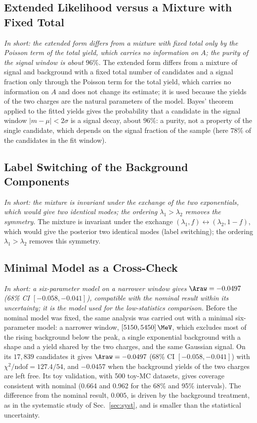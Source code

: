 \subsection{Extended Likelihood versus a Mixture with Fixed Total}
\emph{In short: the extended form differs from a mixture with fixed total only by the Poisson term of the total yield, which carries no information on $A$; the purity of the signal window is about $96\%$.}
The extended form differs from a mixture of signal and background with a fixed total number of candidates and a signal fraction only through the Poisson term for the total yield, which carries no information on $A$ and does not change its estimate; it is used because the yields of the two charges are the natural parameters of the model. Bayes' theorem applied to the fitted yields gives the probability that a candidate in the signal window $|m-\mu|<2\sigma$ is a signal decay, about $96\%$: a purity, not a property of the single candidate, which depends on the signal fraction of the sample (here $78\%$ of the candidates in the fit window).

\subsection{Label Switching of the Background Components}
\emph{In short: the mixture is invariant under the exchange of the two exponentials, which would give two identical modes; the ordering $\lambda_1>\lambda_2$ removes the symmetry.}
The mixture is invariant under the exchange $(\lambda_1,f)\leftrightarrow(\lambda_2,1-f)$, which would give the posterior two identical modes (label switching); the ordering $\lambda_1>\lambda_2$ removes this symmetry.

\subsection{Minimal Model as a Cross-Check}
\label{sec:bayes_minimal}
\emph{In short: a six-parameter model on a narrower window gives $\Araw=-0.0497$ (68\% CI $[-0.058,-0.041]$), compatible with the nominal result within its uncertainty; it is the model used for the low-statistics comparison.}
Before the nominal model was fixed, the same analysis was carried out with a minimal six-parameter model: a narrower window, $[5150,5450]\,\MeV$, which excludes most of the rising background below the peak, a single exponential background with a shape and a yield shared by the two charges, and the same Gaussian signal. On its $17{,}839$ candidates it gives $\Araw=-0.0497$ (68\% CI $[-0.058,-0.041]$) with $\chi^2/\text{ndof}=127.4/54$, and $-0.0457$ when the background yields of the two charges are left free. Its toy validation, with 500 toy-MC datasets, gives coverage consistent with nominal (0.664 and 0.962 for the 68\% and 95\% intervals). The difference from the nominal result, $0.005$, is driven by the background treatment, as in the systematic study of Sec.~\ref{sec:syst}, and is smaller than the statistical uncertainty.

